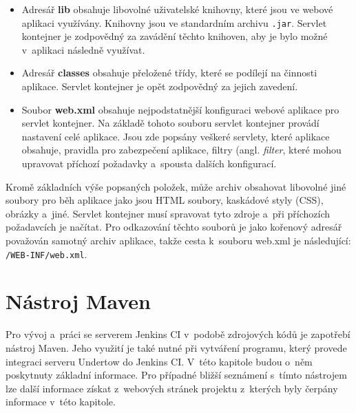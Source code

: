             \begin{itemize}
                \item Adresář \textbf{lib} obsahuje libovolné uživatelské knihovny, které jsou ve webové aplikaci využívány. 
                    Knihovny jsou ve standardním archivu \texttt{.jar}.
                    Servlet kontejner je zodpovědný za zavádění těchto knihoven, aby je bylo možné v~aplikaci následně využívat.

                \item Adresář \textbf{classes} obsahuje přeložené třídy, které se podílejí na činnosti aplikace. 
                    Servlet kontejner je opět zodpovědný za jejich zavedení. 

                \item Soubor \textbf{web.xml} obsahuje nejpodstatnější konfiguraci webové aplikace pro servlet kontejner.
                    Na základě tohoto souboru servlet kontejner provádí nastavení celé aplikace.
                    Jsou zde popsány veškeré servlety, které aplikace obsahuje, pravidla pro zabezpečení aplikace,
                    filtry (angl. \emph{filter}, které mohou upravovat příchozí požadavky a~spousta dalších konfigurací. 
            \end{itemize}

            Kromě základních výše popsaných položek, může archiv obsahovat libovolné jiné soubory pro běh aplikace jako jsou 
            HTML soubory, kaskádové styly (CSS), obrázky a~jiné. Servlet kontejner musí spravovat tyto zdroje
            a~při příchozích požadavcích je načítat. Pro odkazování těchto souborů je jako kořenový adresář považován
            samotný archiv aplikace, takže cesta k~souboru web.xml je následující: \texttt{/WEB-INF/web.xml}.

            
         
    \section{Nástroj Maven} \label{maven}
        Pro vývoj a~práci se serverem Jenkins CI v~podobě zdrojových kódů je zapotřebí nástroj Maven. 
        Jeho využití je také nutné při vytváření programu, který provede integraci serveru Undertow do Jenkins CI. 
        V~této kapitole budou o~něm poskytnuty základní informace. Pro případné bližší
        seznámení s~tímto nástrojem lze další informace získat z~webových stránek projektu \cite{mavenWeb}
        z~kterých byly čerpány informace v~této kapitole. 
        
